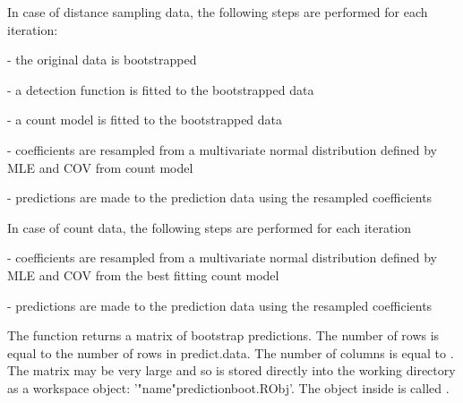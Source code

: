 \documentclass[a4paper]{book}
\begin{document}
%
\begin{Details}\relax
In case of distance sampling data, the following steps are performed for each iteration: 

- the original data is bootstrapped

- a detection function is fitted to the bootstrapped data

- a count model is fitted to the bootstrapped data

- coefficients are resampled from a multivariate normal distribution defined by MLE and COV from count model

- predictions are made to the prediction data using the resampled coefficients 

In case of count data, the following steps are performed for each iteration

- coefficients are resampled from a multivariate normal distribution defined by MLE and COV from the best fitting count model

- predictions are made to the prediction data using the resampled coefficients
\end{Details}
%
\begin{Value}
The function returns a matrix of bootstrap predictions. The number of rows is equal to the number of rows in predict.data.  The number of columns is equal to .  The matrix may be very large and so is stored directly into the working directory as a workspace object: '"name"predictionboot.RObj'.  The object inside is called .
\end{Value}
%
\end{document}

